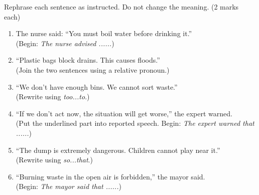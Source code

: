 \documentclass[11pt]{article}
\begin{document}
\begin{exercice}
Rephrase each sentence as instructed. Do not change the meaning. (2 marks each)

\begin{enumerate}
\item The nurse said: ``You must boil water before drinking it.'' \\
(Begin: \emph{The nurse advised ......})
\item ``Plastic bags block drains. This causes floods.'' \\
(Join the two sentences using a relative pronoun.)
\item ``We don't have enough bins. We cannot sort waste.'' \\
(Rewrite using \emph{too...to}.)
\item ``If we don't act now, the situation will get worse,'' the expert warned. \\
(Put the underlined part into reported speech. Begin: \emph{The expert warned that ......})
\item ``The dump is extremely dangerous. Children cannot play near it.'' \\
(Rewrite using \emph{so...that}.)
\item ``Burning waste in the open air is forbidden,'' the mayor said. \\
(Begin: \emph{The mayor said that ......})
\end{enumerate}
\end{exercice}
\end{document}
